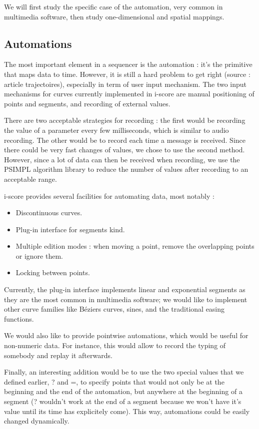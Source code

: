 \documentclass{sigchi}
\begin{document}
We will first study the specific case of the automation, very common in multimedia software, then study one-dimensional and spatial mappings.
\subsection{Automations}
The most important element in a sequencer is the automation : it's the primitive that maps data to time. However, it is still a hard problem to get right (source : article trajectoires), especially in term of user input mechanism. The two input mechanisms for curves currently implemented in i-score are manual positioning of points and segments, and recording of external values. 

There are two acceptable strategies for recording : the first would be recording the value of a parameter every few milliseconds, which is similar to audio recording. The other would be to record each time a message is received. Since there could be very fast changes of values, we chose to use the second method.
However, since a lot of data can then be received when recording, we use the PSIMPL\cite{psimpl} algorithm library to reduce the number of values after recording to an acceptable range.

i-score provides several facilities for automating data, most notably : 
\begin{itemize}
    \item Discontinuous curves.
    \item Plug-in interface for segments kind.
    \item Multiple edition modes : when moving a point, remove the overlapping points or ignore them.
    \item Locking between points.
\end{itemize}

Currently, the plug-in interface implements linear and exponential segments as they are the most common in multimedia software; we would like to implement other curve families like Béziers curves, sines, and the traditional easing functions\cite{hudson1993animation}.

We would also like to provide pointwise automations, which would be useful for non-numeric data. For instance, this would allow to record the typing of somebody and replay it afterwards.

Finally, an interesting addition would be to use the two special values that we defined earlier, ? and =, to specify points that would not only be at the beginning and the end of the automation, but anywhere at the beginning of a segment (? wouldn't work at the end of a segment because we won't have it's value until its time has explicitely come). This way, automations could be easily changed dynamically.
\end{document}
